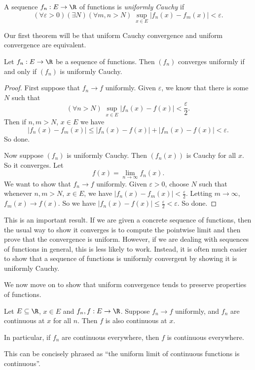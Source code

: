 \documentclass[a4paper]{article}
\begin{document}
\begin{defi}
  A sequence $f_n: E\to \R$ of functions is \emph{uniformly Cauchy} if
  \[
    (\forall \varepsilon > 0)(\exists N)(\forall m,n > N)\;\sup_{x\in E}|f_n(x) - f_m(x)| < \varepsilon.
  \]
\end{defi}

Our first theorem will be that uniform Cauchy convergence and uniform convergence are equivalent.

\begin{thm}
  Let $f_n: E\to \R$ be a sequence of functions. Then $(f_n)$ converges uniformly if and only if $(f_n)$ is uniformly Cauchy.
\end{thm}

\begin{proof}
  First suppose that $f_n \to f$ uniformly. Given $\varepsilon$, we know that there is some $N$ such that
  \[
    (\forall n > N)\; \sup_{x\in E} |f_n(x) - f(x)| < \frac{\varepsilon}{2}.
  \]
  Then if $n, m > N$, $x\in E$ we have
  \[
    |f_n(x) - f_m(x)| \leq |f_n(x) - f(x)| + |f_m(x) - f(x)| < \varepsilon.
  \]
  So done.

  Now suppose $(f_n)$ is uniformly Cauchy. Then $(f_n(x))$ is Cauchy for all $x$. So it converges. Let
  \[
    f(x) = \lim_{n\to \infty}f_n(x).
  \]
  We want to show that $f_n \to f$ uniformly. Given $\varepsilon > 0$, choose $N$ such that whenever $n, m > N$, $x\in E$, we have $|f_n(x) - f_m(x)| < \frac{\varepsilon}{2}$. Letting $m\to \infty$, $f_m(x) \to f(x)$. So we have $|f_n(x) - f(x)| \leq \frac{\varepsilon}{2} < \varepsilon$. So done.
\end{proof}

This is an important result. If we are given a concrete sequence of functions, then the usual way to show it converges is to compute the pointwise limit and then prove that the convergence is uniform. However, if we are dealing with sequences of functions in general, this is less likely to work. Instead, it is often much easier to show that a sequence of functions is uniformly convergent by showing it is uniformly Cauchy.

We now move on to show that uniform convergence tends to preserve properties of functions.
\begin{thm}
  Let $E \subseteq \R$, $x \in E$ and $f_n, f: E\to \R$. Suppose $f_n \to f$ uniformly, and $f_n$ are continuous at $x$ for all $n$. Then $f$ is also continuous at $x$.

  In particular, if $f_n$ are continuous everywhere, then $f$ is continuous everywhere.
\end{thm}
This can be concisely phrased as ``the uniform limit of continuous functions is continuous''.
\end{document}
